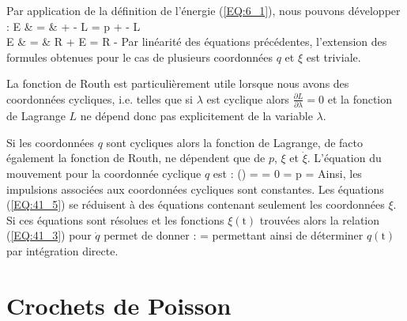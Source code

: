 Par application de la d\'{e}finition de l'\'{e}nergie (\ref{EQ:6_1}), nous pouvons d\'{e}velopper :
\bea
	E & = &  + \dot{\xi} - L = p + \dot{\xi} - L \nonumber \\
	\Leftrightarrow E & = & R + \dot{\xi} \Leftrightarrow E = R - \dot{\xi} \label{EQ:41_6}
\eea
Par lin\'{e}arit\'{e} des \'{e}quations pr\'{e}c\'{e}dentes, l'extension des formules obtenues pour le cas de plusieurs coordonn\'{e}es $q$ et $\xi$ est triviale.

La fonction de Routh est particuli\`{e}rement utile lorsque nous avons des coordonn\'{e}es cycliques, i.e. telles que si $\lambda$ est cyclique alors $\frac{\partial L}{\partial\lambda} = 0$ et la fonction de Lagrange $L$ ne d\'{e}pend donc pas explicitement de la variable $\lambda$.

Si les coordonn\'{e}es $q$ sont cycliques alors la fonction de Lagrange, de facto \'{e}galement la fonction de Routh, ne d\'{e}pendent que de $p$, $\xi$ et $\dot{\xi}$. L'\'{e}quation du mouvement pour la coordonn\'{e}e cyclique $q$ est :
\benn
	\left(\right) =  = 0 \Rightarrow {} = p = 
\eenn
Ainsi, les impulsions associ\'{e}es aux coordonn\'{e}es cycliques sont constantes. Les \'{e}quations (\ref{EQ:41_5}) se r\'{e}duisent \`{a} des \'{e}quations contenant seulement les coordonn\'{e}es $\xi$. Si ces \'{e}quations sont r\'{e}solues et les fonctions $\xi(\mathrm{t})$ trouv\'{e}es alors la relation (\ref{EQ:41_3}) pour $\dot{q}$ permet de donner :
\benn
	 = 
\eenn
permettant ainsi de d\'{e}terminer $q(\mathrm{t})$ par int\'{e}gration directe.

\section{Crochets de Poisson}\label{PAR:42}

